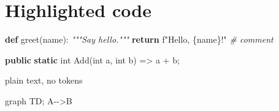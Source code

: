 \documentclass[
]{article}
\author{}
\date{}
\newenvironment{Shaded}{}{}
\newcommand{\BuiltInTok}[1]{\textcolor[rgb]{0.00,0.50,0.00}{#1}}
\newcommand{\CommentTok}[1]{\textcolor[rgb]{0.38,0.63,0.69}{\textit{#1}}}
\newcommand{\ControlFlowTok}[1]{\textcolor[rgb]{0.00,0.44,0.13}{\textbf{#1}}}
\newcommand{\DataTypeTok}[1]{\textcolor[rgb]{0.56,0.13,0.00}{#1}}
\newcommand{\FunctionTok}[1]{\textcolor[rgb]{0.02,0.16,0.49}{#1}}
\newcommand{\KeywordTok}[1]{\textcolor[rgb]{0.00,0.44,0.13}{\textbf{#1}}}
\newcommand{\NormalTok}[1]{#1}
\newcommand{\OperatorTok}[1]{\textcolor[rgb]{0.40,0.40,0.40}{#1}}
\newcommand{\PreprocessorTok}[1]{\textcolor[rgb]{0.74,0.48,0.00}{#1}}
\newcommand{\SpecialCharTok}[1]{\textcolor[rgb]{0.25,0.44,0.63}{#1}}
\newcommand{\SpecialStringTok}[1]{\textcolor[rgb]{0.73,0.40,0.53}{#1}}
\newcommand{\StringTok}[1]{\textcolor[rgb]{0.25,0.44,0.63}{#1}}
\newcommand{\VariableTok}[1]{\textcolor[rgb]{0.10,0.09,0.49}{#1}}
\begin{document}
\section{Highlighted code}\label{highlighted-code}

\begin{Shaded}
\begin{Highlighting}[]
\KeywordTok{def}\NormalTok{ greet(name):}
    \CommentTok{"""Say hello."""}
    \ControlFlowTok{return} \SpecialStringTok{f"Hello, }\SpecialCharTok{\{}\NormalTok{name}\SpecialCharTok{\}}\SpecialStringTok{!"}  \CommentTok{\# comment}
\end{Highlighting}
\end{Shaded}

\begin{Shaded}
\end{Shaded}

\begin{Shaded}
\begin{Highlighting}[]
\KeywordTok{public} \KeywordTok{static} \DataTypeTok{int} \FunctionTok{Add}\OperatorTok{(}\DataTypeTok{int}\NormalTok{ a}\OperatorTok{,} \DataTypeTok{int}\NormalTok{ b}\OperatorTok{)} \OperatorTok{=\textgreater{}}\NormalTok{ a }\OperatorTok{+}\NormalTok{ b}\OperatorTok{;}
\end{Highlighting}
\end{Shaded}

\begin{Shaded}
\begin{Highlighting}[]
\NormalTok{plain text, no tokens}
\end{Highlighting}
\end{Shaded}

\begin{Shaded}
\begin{Highlighting}[]
\NormalTok{graph TD; A{-}{-}\textgreater{}B}
\end{Highlighting}
\end{Shaded}

\begin{Shaded}
\begin{Highlighting}[]

\end{Highlighting}
\end{Shaded}
\end{document}
